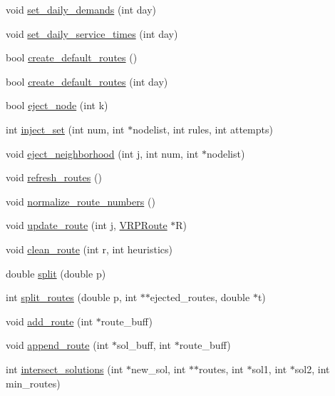 \begin{DoxyCompactItemize}
\item 
void \hyperlink{class_v_r_p_acb5f69737f56a2abdcb05fcb7a994396}{set\_\-daily\_\-demands} (int day)
\item 
void \hyperlink{class_v_r_p_a90bd8e393c92c78fcab13b22c283e88f}{set\_\-daily\_\-service\_\-times} (int day)
\item 
bool \hyperlink{class_v_r_p_a6ba7dfc7f4a60f4b098e13dc87fc2212}{create\_\-default\_\-routes} ()
\item 
bool \hyperlink{class_v_r_p_a88a2eb7e0503aa9b0a4a004ede31b58f}{create\_\-default\_\-routes} (int day)
\item 
bool \hyperlink{class_v_r_p_af222e1b7a1d55c864e37ca237cce2408}{eject\_\-node} (int k)
\item 
int \hyperlink{class_v_r_p_ae3abaa97f9abf1a46348068a5a11d4e8}{inject\_\-set} (int num, int $\ast$nodelist, int rules, int attempts)
\item 
void \hyperlink{class_v_r_p_acaf05691fee990e75fa6e2bd9a53d6ce}{eject\_\-neighborhood} (int j, int num, int $\ast$nodelist)
\item 
void \hyperlink{class_v_r_p_a0780f49cd584076612217a25b2c92c67}{refresh\_\-routes} ()
\item 
void \hyperlink{class_v_r_p_ac3b9b76240401f3e9be1153d4ea703fd}{normalize\_\-route\_\-numbers} ()
\item 
void \hyperlink{class_v_r_p_a53c375f3acdb43efc3f2e63b40cdca01}{update\_\-route} (int j, \hyperlink{class_v_r_p_route}{VRPRoute} $\ast$R)
\item 
void \hyperlink{class_v_r_p_ac574e47d01cbb632c4b3b398e5dc14a0}{clean\_\-route} (int r, int heuristics)
\item 
double \hyperlink{class_v_r_p_a660ca2a84b28b869d8b4994b00d01f40}{split} (double p)
\item 
int \hyperlink{class_v_r_p_a274f22551361e9575bfc95611fa7df28}{split\_\-routes} (double p, int $\ast$$\ast$ejected\_\-routes, double $\ast$t)
\item 
void \hyperlink{class_v_r_p_a8296873147c5a0cd8c286c294566524b}{add\_\-route} (int $\ast$route\_\-buff)
\item 
void \hyperlink{class_v_r_p_a46304ce927c893445b93c1df22d04863}{append\_\-route} (int $\ast$sol\_\-buff, int $\ast$route\_\-buff)
\item 
int \hyperlink{class_v_r_p_add02d688670a2a569755981227421800}{intersect\_\-solutions} (int $\ast$new\_\-sol, int $\ast$$\ast$routes, int $\ast$sol1, int $\ast$sol2, int min\_\-routes)
\item 

\end{DoxyCompactItemize}

